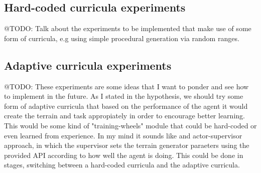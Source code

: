\subsection{Hard-coded curricula experiments}

@TODO: Talk about the experiments to be implemented that make use of some form
       of curricula, e.g using simple procedural generation via random ranges.

\subsection{Adaptive curricula experiments}

@TODO: These experiments are some ideas that I want to ponder and see how to implement
       in the future. As I stated in the hypothesis, we should try some form of
       adaptive curricula that based on the performance of the agent it would create
       the terrain and task appropiately in order to encourage better learning. This
       would be some kind of "training-wheels" module that could be hard-coded or even 
       learned from experience. In my mind it sounds like and actor-supervisor approach,
       in which the supervisor sets the terrain generator paraeters using the provided API
       according to how well the agent is doing. This could be done in stages, switching between
       a hard-coded curricula and the adaptive curricula.


